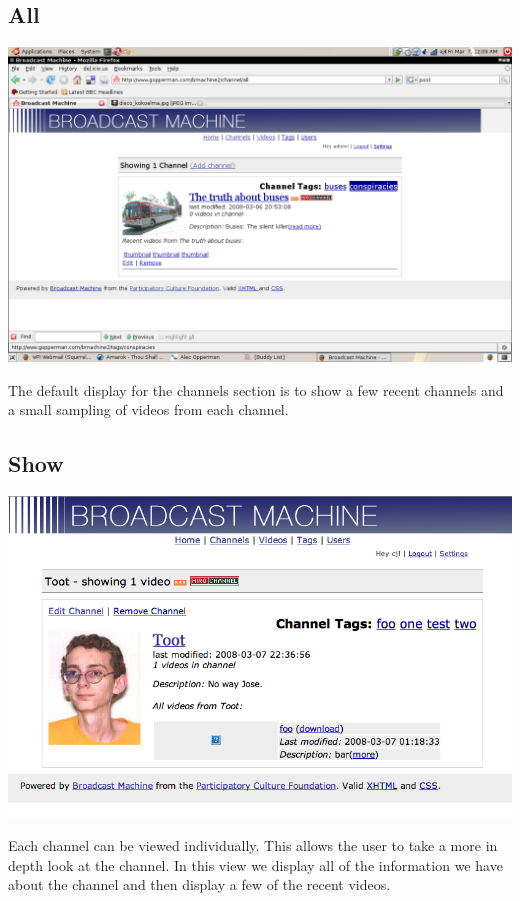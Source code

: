 \documentclass[a4paper,12pt]{report}
\begin{document}
\subsection{All}
\includegraphics[width=150mm]{images/channelall.png}

The default display for the channels section is to show a few recent channels and a small sampling of videos from each channel.

\subsection{Show}
\includegraphics[width=150mm]{images/channelshow.png}

Each channel can be viewed individually.
This allows the user to take a more in depth look at the channel.
In this view we display all of the information we have about the channel and then display a few of the recent videos.
\end{document}
